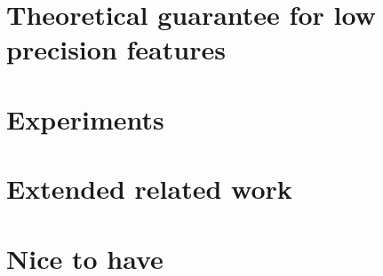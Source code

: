 \documentclass{article}
\begin{document}
%

\section{Theoretical guarantee for low precision features}
\label{sec:lprff_theory_appendix}


\section{Experiments}
\label{sec:exp_details}


%

\section{Extended related work}
\label{sec:app_extended_related}



%

\section{Nice to have}
\label{sec:nicetohave}

\end{document}
